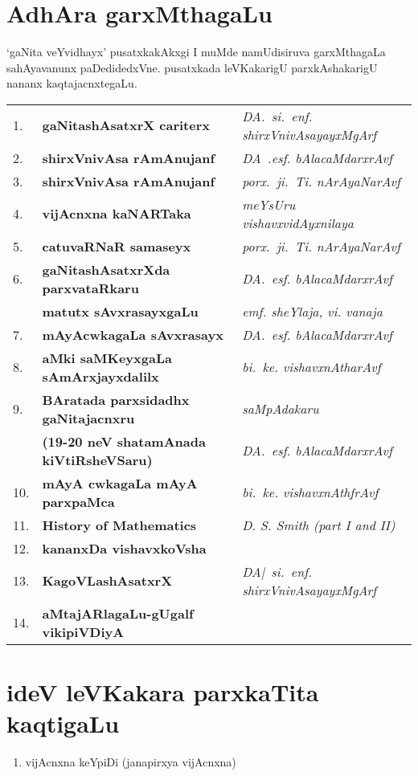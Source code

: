 {\newpage
\section*{AdhAra garxMthagaLu}

`gaNita veYvidhayx' pusatxkakAkxgi I muMde namUdisiruva garxMthagaLa sahAyavanunx paDedidedxVne. pusatxkada leVKakarigU parxkAshakarigU nananx kaqtajacnxtegaLu.

\begin{longtable}{l>{\raggedright}p{4cm}>{\raggedright}p{4cm}}
{\rm 1.} &  {\bf gaNitashAsatxrX cariterx} & {\sl DA.~si.~enf. shirxVnivAsayayxMgArf} \tabularnewline
{\rm 2.} & {\bf shirxVnivAsa rAmAnujanf} & {\sl DA~.esf. bAlacaMdarxrAvf}\tabularnewline
{\rm 3.} & {\bf shirxVnivAsa rAmAnujanf} & {\sl porx.~ji.~Ti. nArAyaNarAvf}\tabularnewline
{\rm 4.} & {\bf vijAcnxna kaNARTaka} & {\sl meYsUru vishavxvidAyxnilaya}\tabularnewline
{\rm 5.} & {\bf catuvaRNaR samaseyx} & {\sl porx.~ji.~Ti. nArAyaNarAvf}\tabularnewline
{\rm 6.} & {\bf gaNitashAsatxrXda parxvataRkaru} & {\sl DA.~esf. bAlacaMdarxrAvf}\tabularnewline[-0.1cm]
         & {\bf matutx sAvxrasayxgaLu} & {\sl emf. sheYlaja, vi. vanaja}\tabularnewline
{\rm 7.} & {\bf mAyAcwkagaLa sAvxrasayx} & {\sl DA.~esf. bAlacaMdarxrAvf}\tabularnewline
{\rm 8.} & {\bf aMki saMKeyxgaLa sAmArxjayxdalilx} & {\sl bi.~ke. vishavxnAtharAvf}\tabularnewline
{\rm 9.} & {\bf BAratada parxsidadhx gaNitajacnxru}  & {\sl saMpAdakaru} \tabularnewline[-0.1cm]
         & {\bf ({\rm\textbf{19-20}} neV shatamAnada kiVtiRsheVSaru)} & {\sl DA.~esf. bAlacaMdarxrAvf}\tabularnewline
{\rm 10.} & {\bf mAyA cwkagaLa mAyA parxpaMca} & {\sl bi.~ke. vishavxnAthfrAvf}\tabularnewline
{\rm 11.} & {\rm\textbf{History of Mathematics}} & {\rm\textit{D. S. Smith (part I and II)}}\tabularnewline[-0.1cm]
{\rm 12.} & {\bf kananxDa vishavxkoVsha} &\tabularnewline
{\rm 13.} & {\bf KagoVLashAsatxrX} & {\sl DA|~si.~enf. shirxVnivAsayayxMgArf}\tabularnewline
{\rm 14.} & {\bf aMtajARlagaLu-gUgalf vikipiVDiyA} &\tabularnewline
\end{longtable}

\newpage
\section*{ideV leVKakara parxkaTita kaqtigaLu}

\begin{enumerate}[\rm 1.]
\item vijAcnxna keYpiDi (janapirxya vijAcnxna)


\end{enumerate}}
